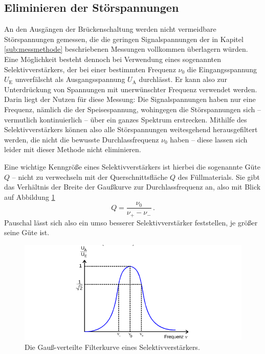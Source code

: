\subsection{Eliminieren der Störspannungen}

    An den Ausgängen der Brückenschaltung werden nicht vermeidbare Störspannungen gemessen, die die geringen Signalspannungen 
    der in Kapitel \ref{sub:messmethode} beschriebenen Messungen vollkommen überlagern würden. 
    Eine Möglichkeit besteht dennoch bei Verwendung eines sogenannten Selektivverstärkers, der bei einer bestimmten Frequenz $\nu _0$
    die Eingangsspannung $U_\text{E}$ unverfälscht als Ausgangsspannung $U_\text{A}$ durchlässt. 
    Er kann also zur Unterdrückung von Spannungen mit unerwünschter Frequenz verwendet werden. 
    Darin liegt der Nutzen für diese Messung: 
    Die Signalspannungen haben nur eine Frequenz, nämlich die der Speisespannung, wohingegen die Störspannungen sich -- 
    vermutlich kontinuierlich -- über ein ganzes Spektrum erstrecken. 
    Mithilfe des Selektivverstärkers können also alle Störspannungen weitesgehend herausgefiltert werden, die nicht die 
    bewusste Durchlassfrequenz $\nu _0$ haben -- diese lassen sich leider mit dieser Methode nicht eliminieren. 

    Eine wichtige Kenngröße eines Selektivverstärkers ist hierbei die sogenannte Güte $Q$ -- nicht zu verwechseln mit der 
    Querschnittsfläche $Q$ des Füllmaterials. 
    Sie gibt das Verhältnis der Breite der Gaußkurve zur Durchlassfrequenz an, also mit Blick auf Abbildung \ref{fig:Kaffeefilter}
    \begin{equation*}
        Q=\frac{\nu _0}{\nu_+ -\nu_-}\,.
    \end{equation*}
    Pauschal lässt sich also ein umso besserer Selektivverstärker feststellen, je größer seine Güte ist. 
    \begin{figure}
        \centering
        \includegraphics[width=\textwidth]{plots/Kaffeefilter.png}
        \caption{Die Gauß-verteilte Filterkurve eines Selektivverstärkers\cite{Versuchsanleitung}.}
        \label{fig:Kaffeefilter}
    \end{figure}

